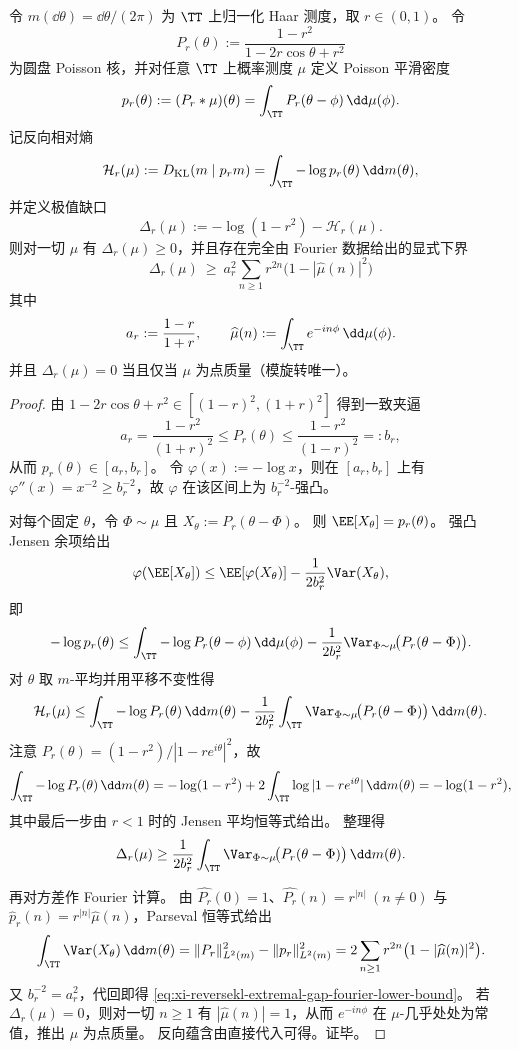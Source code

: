 \begin{theorem}\label{thm:xi-reversekl-poisson-extremal-gap-fourier-stability}
令 \(m(\dd\theta)=\dd\theta/(2\pi)\) 为 \(\TT\) 上归一化 Haar 测度，取 \(r\in(0,1)\)。
令
\[
P_r(\theta):=\frac{1-r^2}{1-2r\cos\theta+r^2}
\]
为圆盘 Poisson 核，并对任意 \(\TT\) 上概率测度 \(\mu\) 定义 Poisson 平滑密度
\[
p_r(\theta):=(P_r*\mu)(\theta)=\int_{\TT}P_r(\theta-\phi)\,\dd\mu(\phi).
\]
记反向相对熵
\[
\mathcal H_r(\mu):=D_{\mathrm{KL}}(m\mid p_rm)=\int_{\TT}-\log p_r(\theta)\,\dd m(\theta),
\]
并定义极值缺口
\[
\Delta_r(\mu):=-\log(1-r^2)-\mathcal H_r(\mu).
\]
则对一切 \(\mu\) 有 \(\Delta_r(\mu)\ge 0\)，并且存在完全由 Fourier 数据给出的显式下界
\begin{equation}\label{eq:xi-reversekl-extremal-gap-fourier-lower-bound}
\boxed{\;
\Delta_r(\mu)\ \ge\ a_r^2\sum_{n\ge 1} r^{2n}\bigl(1-|\widehat\mu(n)|^2\bigr)\; }
\end{equation}
其中
\[
a_r:=\frac{1-r}{1+r},\qquad
\widehat\mu(n):=\int_{\TT}e^{-in\phi}\,\dd\mu(\phi).
\]
并且 \(\Delta_r(\mu)=0\) 当且仅当 \(\mu\) 为点质量（模旋转唯一）。
\end{theorem}
\begin{proof}
由
\(
1-2r\cos\theta+r^2\in[(1-r)^2,(1+r)^2]
\)
得到一致夹逼
\[
a_r=\frac{1-r^2}{(1+r)^2}\le P_r(\theta)\le \frac{1-r^2}{(1-r)^2}=:b_r,
\]
从而 \(p_r(\theta)\in[a_r,b_r]\)。
令 \(\varphi(x):=-\log x\)，则在 \([a_r,b_r]\) 上有 \(\varphi''(x)=x^{-2}\ge b_r^{-2}\)，故 \(\varphi\) 在该区间上为 \(b_r^{-2}\)-强凸。
\par
对每个固定 \(\theta\)，令 \(\Phi\sim\mu\) 且 \(X_\theta:=P_r(\theta-\Phi)\)。
则 \(\EE[X_\theta]=p_r(\theta)\)。
强凸 Jensen 余项给出
\[
\varphi(\EE[X_\theta])\le \EE[\varphi(X_\theta)]-\frac{1}{2b_r^2}\Var(X_\theta),
\]
即
\[
-\log p_r(\theta)\le \int_{\TT}-\log P_r(\theta-\phi)\,\dd\mu(\phi)-\frac{1}{2b_r^2}\Var_{\Phi\sim\mu}\!\bigl(P_r(\theta-\Phi)\bigr).
\]
对 \(\theta\) 取 \(m\)-平均并用平移不变性得
\[
\mathcal H_r(\mu)\le \int_{\TT}-\log P_r(\theta)\,\dd m(\theta)-\frac{1}{2b_r^2}\int_{\TT}\Var_{\Phi\sim\mu}\!\bigl(P_r(\theta-\Phi)\bigr)\,\dd m(\theta).
\]
注意 \(P_r(\theta)=(1-r^2)/|1-re^{i\theta}|^2\)，故
\[
\int_{\TT}-\log P_r(\theta)\,\dd m(\theta)
=-\log(1-r^2)+2\int_{\TT}\log|1-re^{i\theta}|\,\dd m(\theta)
=-\log(1-r^2),
\]
其中最后一步由 \(r<1\) 时的 Jensen 平均恒等式给出。
整理得
\[
\Delta_r(\mu)\ge \frac{1}{2b_r^2}\int_{\TT}\Var_{\Phi\sim\mu}\!\bigl(P_r(\theta-\Phi)\bigr)\,\dd m(\theta).
\]
\par
再对方差作 Fourier 计算。
由 \(\widehat{P_r}(0)=1\)、\(\widehat{P_r}(n)=r^{|n|}\ (n\neq 0)\) 与 \(\widehat p_r(n)=r^{|n|}\widehat\mu(n)\)，Parseval 恒等式给出
\[
\int_{\TT}\Var(X_\theta)\,\dd m(\theta)
=\|P_r\|_{L^2(m)}^2-\|p_r\|_{L^2(m)}^2
=2\sum_{n\ge 1}r^{2n}\bigl(1-|\widehat\mu(n)|^2\bigr).
\]
又 \(b_r^{-2}=a_r^2\)，代回即得 \eqref{eq:xi-reversekl-extremal-gap-fourier-lower-bound}。
若 \(\Delta_r(\mu)=0\)，则对一切 \(n\ge 1\) 有 \(|\widehat\mu(n)|=1\)，从而 \(e^{-in\phi}\) 在 \(\mu\)-几乎处处为常值，推出 \(\mu\) 为点质量。
反向蕴含由直接代入可得。证毕。
\end{proof}

